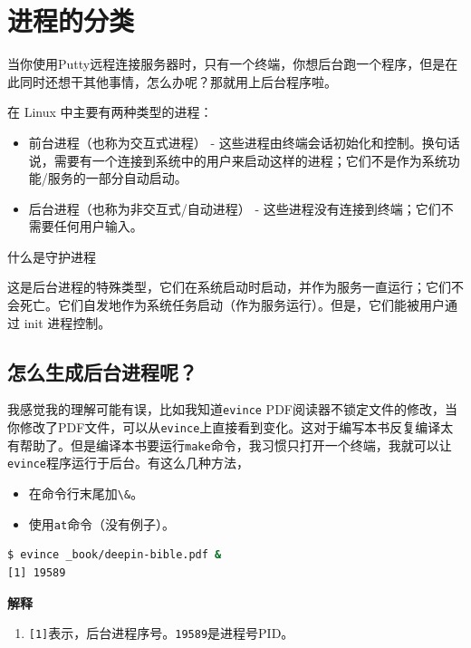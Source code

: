 \documentclass[doctor,openright,twoside]{sjtuthesis}
\providecommand{\tightlist}{%
    \setlength{\itemsep}{0pt}\setlength{\parskip}{0pt}}
\newcommand{\passthrough}[1]{#1}
\theoremstyle{plain}
\theoremstyle{definition}
\theoremstyle{remark}
\theoremstyle{ocrenumbox}
\theoremstyle{plain}
\begin{document}
\hypertarget{section-96}{%
\section{进程的分类}\label{section-96}}

当你使用Putty远程连接服务器时，只有一个终端，你想后台跑一个程序，但是在此同时还想干其他事情，怎么办呢？那就用上后台程序啦。

在 Linux 中主要有两种类型的进程：

\begin{itemize}
\tightlist
\item
  前台进程（也称为交互式进程） - 这些进程由终端会话初始化和控制。换句话说，需要有一个连接到系统中的用户来启动这样的进程；它们不是作为系统功能/服务的一部分自动启动。
\item
  后台进程（也称为非交互式/自动进程） - 这些进程没有连接到终端；它们不需要任何用户输入。
\end{itemize}

什么是守护进程

这是后台进程的特殊类型，它们在系统启动时启动，并作为服务一直运行；它们不会死亡。它们自发地作为系统任务启动（作为服务运行）。但是，它们能被用户通过 init 进程控制。

\hypertarget{section-97}{%
\subsection{怎么生成后台进程呢？}\label{section-97}}

我感觉我的理解可能有误，比如我知道\passthrough{\lstinline!evince!} PDF阅读器不锁定文件的修改，当你修改了PDF文件，可以从\passthrough{\lstinline!evince!}上直接看到变化。这对于编写本书反复编译太有帮助了。但是编译本书要运行\passthrough{\lstinline!make!}命令，我习惯只打开一个终端，我就可以让\passthrough{\lstinline!evince!}程序运行于后台。有这么几种方法，

\begin{itemize}
\tightlist
\item
  在命令行末尾加\passthrough{\lstinline!\&!}。
\item
  使用\passthrough{\lstinline!at!}命令（没有例子）。
\end{itemize}

\begin{lstlisting}[language=bash]
$ evince _book/deepin-bible.pdf &
[1] 19589
\end{lstlisting}

\textbf{解释}

\begin{enumerate}
\def\labelenumi{\arabic{enumi}.}
\tightlist
\item
  \passthrough{\lstinline![1]!}表示，后台进程序号。\passthrough{\lstinline!19589!}是进程号PID。
\end{enumerate}
\end{document}

